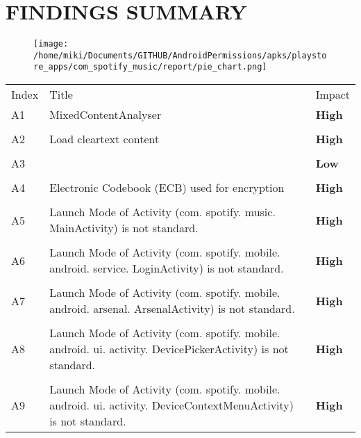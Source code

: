 \documentclass[12p]{article}
\begin{document}
\section{FINDINGS SUMMARY}\label{sec:summary}
\begin{figure}[H]
\centering
	\texttt{[image: /home/miki/Documents/GITHUB/AndroidPermissions/apks/playstore\_apps/com\_spotify\_music/report/pie\_chart.png]}
\end{figure}
	\begin{longtable}{p{0.5cm} p{10cm} p{1.5cm}}
	\rowcolor{grannysmithapple!70} Index & Title & Impact \\
	A1&MixedContentAnalyser& \color{ferrarired}\textbf{High} \\
\hline\\	A2&Load cleartext content& \color{ferrarired}\textbf{High} \\
\hline\\	A3&& \color{amber}\textbf{Low} \\
\hline\\	A4&Electronic Codebook \newline (ECB) used for encryption& \color{ferrarired}\textbf{High} \\
\hline\\	A5&Launch Mode of Activity \newline (com. spotify. music. MainActivity) is not standard.& \color{ferrarired}\textbf{High} \\
\hline\\	A6&Launch Mode of Activity \newline (com. spotify. mobile. android. service. LoginActivity) is not standard.& \color{ferrarired}\textbf{High} \\
\hline\\	A7&Launch Mode of Activity \newline (com. spotify. mobile. android. arsenal. ArsenalActivity) is not standard.& \color{ferrarired}\textbf{High} \\
\hline\\	A8&Launch Mode of Activity \newline (com. spotify. mobile. android. ui. activity. DevicePickerActivity) is not standard.& \color{ferrarired}\textbf{High} \\
\hline\\	A9&Launch Mode of Activity \newline (com. spotify. mobile. android. ui. activity. DeviceContextMenuActivity) is not standard.& \color{ferrarired}\textbf{High} \\

\end{longtable}
\end{document}
